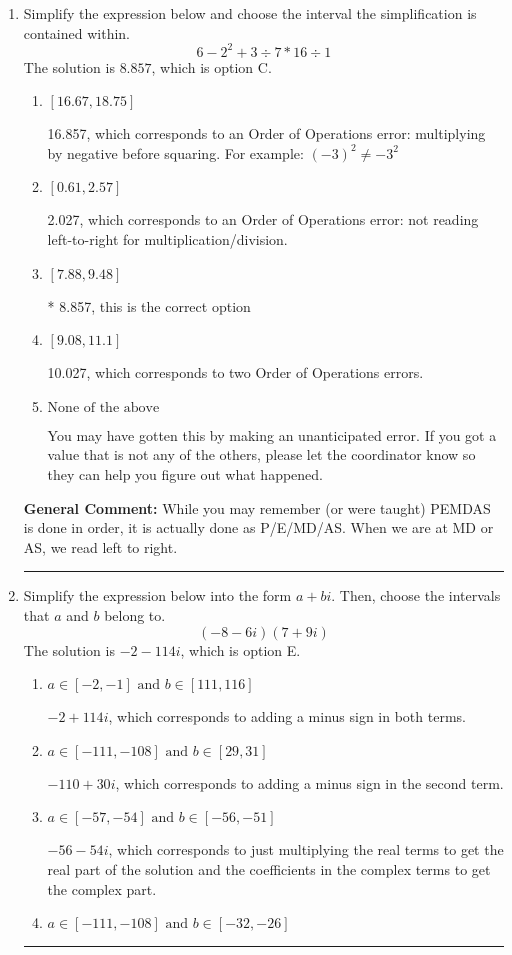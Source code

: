 \documentclass{extbook}[14pt]
\newcommand{\litem}[1]{\item #1

\rule{\textwidth}{0.4pt}}
\begin{document}
\begin{enumerate}
{ Irrational numbers are more than just square root of 3: adding or subtracting values from square root of 3 is also irrational.
}
\litem{
Simplify the expression below and choose the interval the simplification is contained within.
\[ 6 - 2^2 + 3 \div 7 * 16 \div 1 \]The solution is \( 8.857 \), which is option C.\begin{enumerate}[label=\Alph*.]
\item \( [16.67, 18.75] \)

 16.857, which corresponds to an Order of Operations error: multiplying by negative before squaring. For example: $(-3)^2 \neq -3^2$
\item \( [0.61, 2.57] \)

 2.027, which corresponds to an Order of Operations error: not reading left-to-right for multiplication/division.
\item \( [7.88, 9.48] \)

* 8.857, this is the correct option
\item \( [9.08, 11.1] \)

 10.027, which corresponds to two Order of Operations errors.
\item \( \text{None of the above} \)

 You may have gotten this by making an unanticipated error. If you got a value that is not any of the others, please let the coordinator know so they can help you figure out what happened.
\end{enumerate}

\textbf{General Comment:} While you may remember (or were taught) PEMDAS is done in order, it is actually done as P/E/MD/AS. When we are at MD or AS, we read left to right.
}
\litem{
Simplify the expression below into the form $a+bi$. Then, choose the intervals that $a$ and $b$ belong to.
\[ (-8 - 6 i)(7 + 9 i) \]The solution is \( -2 - 114 i \), which is option E.\begin{enumerate}[label=\Alph*.]
\item \( a \in [-2, -1] \text{ and } b \in [111, 116] \)

 $-2 + 114 i$, which corresponds to adding a minus sign in both terms.
\item \( a \in [-111, -108] \text{ and } b \in [29, 31] \)

 $-110 + 30 i$, which corresponds to adding a minus sign in the second term.
\item \( a \in [-57, -54] \text{ and } b \in [-56, -51] \)

 $-56 - 54 i$, which corresponds to just multiplying the real terms to get the real part of the solution and the coefficients in the complex terms to get the complex part.
\item \( a \in [-111, -108] \text{ and } b \in [-32, -26] \)


\end{enumerate}}
\end{enumerate}
\end{document}
